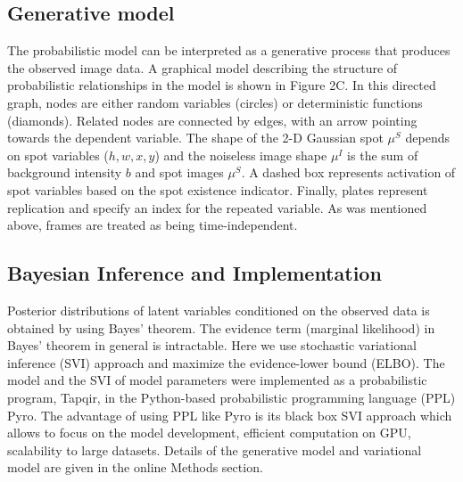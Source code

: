 
\subsection*{Generative model} %

The probabilistic model can be interpreted as a generative process that produces the observed image data. A graphical model describing the structure of probabilistic relationships in the model is shown in Figure 2C. In this directed graph, nodes are either random variables (circles) or deterministic functions (diamonds). Related nodes are connected by edges, with an arrow pointing towards the dependent variable. The shape of the 2-D Gaussian spot $\mu^S$ depends on spot variables ($h, w, x, y$) and the noiseless image shape $\mu^I$ is the sum of background intensity $b$ and spot images $\mu^S$. A dashed box represents activation of spot variables based on the spot existence indicator. Finally, plates represent replication and specify an index for the repeated variable. As was mentioned above, frames are treated as being time-independent. 


\subsection*{Bayesian Inference and Implementation}

Posterior distributions of latent variables conditioned on the observed data is obtained by using Bayes' theorem. The evidence term (marginal likelihood) in Bayes' theorem in general is intractable. Here we use stochastic variational inference (SVI) approach and maximize the evidence-lower bound (ELBO). The model and the SVI of model parameters were implemented as a probabilistic program, Tapqir, in the Python-based probabilistic programming language (PPL) Pyro. The advantage of using PPL like Pyro is its black box SVI approach which allows to focus on the model development, efficient computation on GPU, scalability to large datasets. Details of the generative model and variational model are given in the online Methods section.

